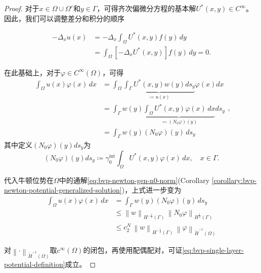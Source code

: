 \begin{proof}
  对于$x \in \Omega \cup \Omega^{c}$和$y \in \Gamma$，可得齐次偏微分方程的基本解$U^{*}(x,y) \in C^{\infty}$。因此，我们可以调整差分和积分的顺序

  \begin{equation*}
  \begin{split}
    - \Delta_{x} u(x) &= - \Delta_{x} \int_{\Omega} U^{*}(x,y) f(y) \, dy \\
    & = \int_{\Omega}
    \left[
    - \Delta_{x} U^{*}(x,y)
    \right]
    f(y) \, dy =0.
  \end{split}
  \end{equation*}

  在此基础上，对于$\varphi \in C^{\infty}(\Omega)$，可得
  \begin{equation*}
    \begin{split}
      \int_{\Omega} u(x) \varphi(x) \, dx
      &= \int_{\Omega} \underbrace{
      \int_{\Gamma} U^{*}(x,y) w(y) d s_y
      }_{\coloneqq u(x)}
      \varphi(x) dx \\
      & = \int_{\Gamma} w(y) \underbrace{
      \int_{\Omega} U^{*}(x,y) \varphi(x) \, dx
      }_{\eqqcolon \left(N_0 \varphi \right)(y)}
      d s_{y} \\
      &= \int_{\Gamma} w(y) \left( N_0 \varphi \right)(y) \, d s_y
    \end{split},
  \end{equation*}
其中定义$\left( N_0 \varphi \right) (y) d s_{y}$为
\begin{equation*}
  \left(N_0 \varphi \right)(y)
  d s_{y} \coloneqq \gamma_{0}^{\text{int}} \int_{\Omega} U^{*}(x,y) \varphi(x) \, d x , \quad x \in \Gamma.
\end{equation*}

代入牛顿位势在$\Omega$中的通解\eqref{eq:bvp-newton-gen-n0-norm}(Corollary \ref{corollary:bvp-newton-potential-generalized-solution})，上式进一步变为
\begin{equation*}
\begin{split}
  \int_{\Omega} u(x) \varphi(x) \, dx &= \int_{\Gamma} w(y) \left( N_0 \varphi \right)(y) \, d s_y \\
  & \le \left\| w \right\|_{H^{-\frac{1}{2}}(\Gamma)} \,
  \left\| N_0 \varphi \right\|_{H^{\frac{1}{2}}(\Gamma)}\\
  & \le c_{2}^{N} \, \left\| w \right\|_{H^{-\frac{1}{2}}(\Gamma)} \,
  \left\| \varphi \right\|_{\widetilde{H}^{-1}(\Omega)}
\end{split}
\end{equation*}

对$\left\| \cdot \right\|_{\widetilde{H}^{-1}(\Omega)}$取$c^{\infty}(\Omega)$的闭包，再使用配偶配对，可证\eqref{eq:bvp-single-layer-potential-definition}成立。
\end{proof}

